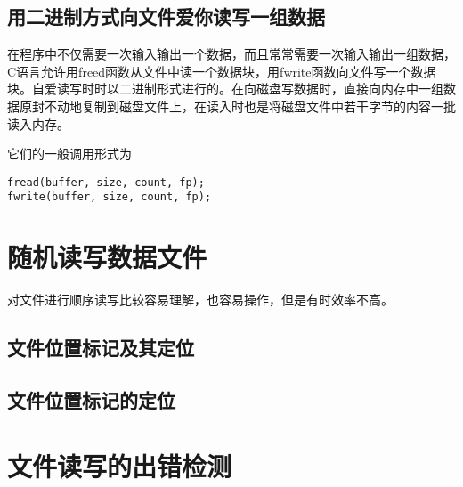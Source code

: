 \subsection{用二进制方式向文件爱你读写一组数据}
在程序中不仅需要一次输入输出一个数据，而且常常需要一次输入输出一组数据，C语言允许用freed函数从文件中读一个数据块，用fwrite函数向文件写一个数据块。自爱读写时时以二进制形式进行的。在向磁盘写数据时，直接向内存中一组数据原封不动地复制到磁盘文件上，在读入时也是将磁盘文件中若干字节的内容一批读入内存。

它们的一般调用形式为
\begin{lstlisting}
fread(buffer, size, count, fp);
fwrite(buffer, size, count, fp);
\end{lstlisting}
\section{随机读写数据文件}
对文件进行顺序读写比较容易理解，也容易操作，但是有时效率不高。
\subsection{文件位置标记及其定位}
\subsection{文件位置标记的定位}
\section{文件读写的出错检测}

